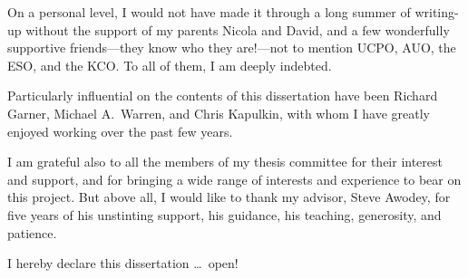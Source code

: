On a personal level, I would not have made it through a long summer of writing-up without the support of my parents Nicola and David, and a few wonderfully supportive friends---they know who they are!---not to mention UCPO, AUO, the ESO, and the KCO.  To all of them, I am deeply indebted.

Particularly influential on the contents of this dissertation have been Richard Garner, Michael A.~Warren, and Chris Kapulkin, with whom I have greatly enjoyed working over the past few years. 

I am grateful also to all the members of my thesis committee for their interest and support, and for bringing a wide range of interests and experience to bear on this project.  But above all, I would like to thank my advisor, Steve Awodey, for five years of his unstinting support, his guidance, his teaching, generosity, and patience.

I hereby declare this dissertation \ldots\ open!  


